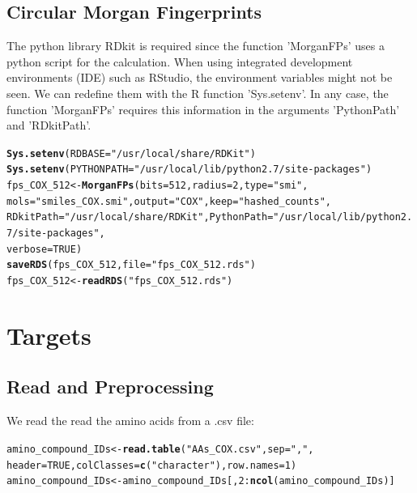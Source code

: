 \documentclass[twoside,a4wide,12pt]{article}\usepackage[]{graphicx}\usepackage[]{color}
\makeatletter
\newcommand{\hlnum}[1]{\textcolor[rgb]{0.686,0.059,0.569}{#1}}%
\newcommand{\hlstr}[1]{\textcolor[rgb]{0.192,0.494,0.8}{#1}}%
\newcommand{\hlopt}[1]{\textcolor[rgb]{0,0,0}{#1}}%
\newcommand{\hlstd}[1]{\textcolor[rgb]{0.345,0.345,0.345}{#1}}%
\newcommand{\hlkwb}[1]{\textcolor[rgb]{0.69,0.353,0.396}{#1}}%
\newcommand{\hlkwc}[1]{\textcolor[rgb]{0.333,0.667,0.333}{#1}}%
\newcommand{\hlkwd}[1]{\textcolor[rgb]{0.737,0.353,0.396}{\textbf{#1}}}%
\newenvironment{kframe}{%
 \def\at@end@of@kframe{}%
 \ifinner\ifhmode%
  \def\at@end@of@kframe{\end{minipage}}%
  \begin{minipage}{\columnwidth}%
 \fi\fi%
 \def\FrameCommand##1{\hskip\@totalleftmargin \hskip-\fboxsep
 \colorbox{shadecolor}{##1}\hskip-\fboxsep
     \hskip-\linewidth \hskip-\@totalleftmargin \hskip\columnwidth}%
 \MakeFramed {\advance\hsize-\width
   \@totalleftmargin\z@ \linewidth\hsize
   \@setminipage}}%
 {\par\unskip\endMakeFramed%
 \at@end@of@kframe}
\newenvironment{knitrout}{}{} %
\makeatother
\begin{document}
\subsection{Circular Morgan Fingerprints}
The python library RDkit is required since the function 'MorganFPs' uses a python script for the calculation.
When using integrated development environments (IDE) such as RStudio,
the environment variables might not be seen.
We can redefine them with the R function 'Sys.setenv'.
In any case, the function 'MorganFPs' requires this information in the arguments 'PythonPath' and 'RDkitPath'.
\begin{knitrout}
\color{fgcolor}\begin{kframe}
\begin{alltt}
\hlkwd{Sys.setenv}\hlstd{(}\hlkwc{RDBASE} \hlstd{=} \hlstr{"/usr/local/share/RDKit"}\hlstd{)}
\hlkwd{Sys.setenv}\hlstd{(}\hlkwc{PYTHONPATH} \hlstd{=} \hlstr{"/usr/local/lib/python2.7/site-packages"}\hlstd{)}
\hlstd{fps_COX_512} \hlkwb{<-} \hlkwd{MorganFPs}\hlstd{(}\hlkwc{bits} \hlstd{=} \hlnum{512}\hlstd{,} \hlkwc{radius} \hlstd{=} \hlnum{2}\hlstd{,} \hlkwc{type} \hlstd{=} \hlstr{"smi"}\hlstd{,}
    \hlkwc{mols} \hlstd{=} \hlstr{"smiles_COX.smi"}\hlstd{,} \hlkwc{output} \hlstd{=} \hlstr{"COX"}\hlstd{,} \hlkwc{keep} \hlstd{=} \hlstr{"hashed_counts"}\hlstd{,}
    \hlkwc{RDkitPath} \hlstd{=} \hlstr{"/usr/local/share/RDKit"}\hlstd{,} \hlkwc{PythonPath} \hlstd{=} \hlstr{"/usr/local/lib/python2.7/site-packages"}\hlstd{,}
    \hlkwc{verbose} \hlstd{=} \hlnum{TRUE}\hlstd{)}
\hlkwd{saveRDS}\hlstd{(fps_COX_512,} \hlkwc{file} \hlstd{=} \hlstr{"fps_COX_512.rds"}\hlstd{)}
\hlstd{fps_COX_512} \hlkwb{<-} \hlkwd{readRDS}\hlstd{(}\hlstr{"fps_COX_512.rds"}\hlstd{)}
\end{alltt}
\end{kframe}
\end{knitrout}


\section{Targets}

\subsection{Read and Preprocessing}
We read the read the amino acids from a .csv file:
\begin{knitrout}
\color{fgcolor}\begin{kframe}
\begin{alltt}
\hlstd{amino_compound_IDs} \hlkwb{<-} \hlkwd{read.table}\hlstd{(}\hlstr{"AAs_COX.csv"}\hlstd{,} \hlkwc{sep} \hlstd{=} \hlstr{","}\hlstd{,}
    \hlkwc{header} \hlstd{=} \hlnum{TRUE}\hlstd{,} \hlkwc{colClasses} \hlstd{=} \hlkwd{c}\hlstd{(}\hlstr{"character"}\hlstd{),} \hlkwc{row.names} \hlstd{=} \hlnum{1}\hlstd{)}
\hlstd{amino_compound_IDs} \hlkwb{<-} \hlstd{amino_compound_IDs[,} \hlnum{2}\hlopt{:}\hlkwd{ncol}\hlstd{(amino_compound_IDs)]}
\end{alltt}
\end{kframe}
\end{knitrout}
\end{document}

